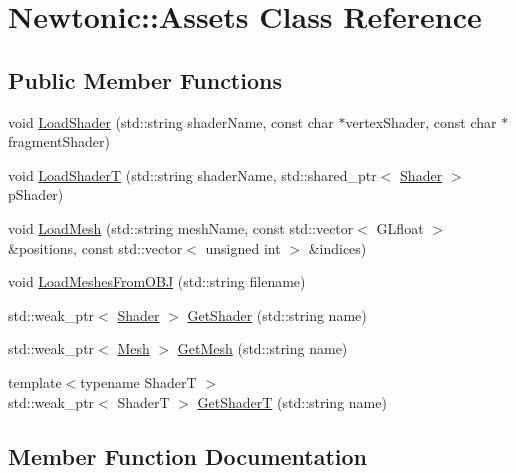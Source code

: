 \hypertarget{classNewtonic_1_1Assets}{}\section{Newtonic\+::Assets Class Reference}
\label{classNewtonic_1_1Assets}
\subsection*{Public Member Functions}
\begin{DoxyCompactItemize}
\item 
void \mbox{\hyperlink{classNewtonic_1_1Assets_ad7ec76d3228c2aa3139a952baadd3dd5}{Load\+Shader}} (std\+::string shader\+Name, const char $\ast$vertex\+Shader, const char $\ast$fragment\+Shader)
\item 
void \mbox{\hyperlink{classNewtonic_1_1Assets_a38d116145edba497b69ee539d8bea633}{Load\+ShaderT}} (std\+::string shader\+Name, std\+::shared\+\_\+ptr$<$ \mbox{\hyperlink{classNewtonic_1_1Shader}{Shader}} $>$ p\+Shader)
\item 
void \mbox{\hyperlink{classNewtonic_1_1Assets_ab188d1ad9d4dbb59abae15a32a8b1423}{Load\+Mesh}} (std\+::string mesh\+Name, const std\+::vector$<$ G\+Lfloat $>$ \&positions, const std\+::vector$<$ unsigned int $>$ \&indices)
\item 
void \mbox{\hyperlink{classNewtonic_1_1Assets_ae9b07e272b24fdaf8e2d1aa89a071694}{Load\+Meshes\+From\+O\+BJ}} (std\+::string filename)
\item 
std\+::weak\+\_\+ptr$<$ \mbox{\hyperlink{classNewtonic_1_1Shader}{Shader}} $>$ \mbox{\hyperlink{classNewtonic_1_1Assets_a475082f857a1da2ae5e58773f19701e0}{Get\+Shader}} (std\+::string name)
\item 
std\+::weak\+\_\+ptr$<$ \mbox{\hyperlink{classNewtonic_1_1Mesh}{Mesh}} $>$ \mbox{\hyperlink{classNewtonic_1_1Assets_a7640682470e122a336e75faa898d4f4b}{Get\+Mesh}} (std\+::string name)
\item 
{\footnotesize template$<$typename ShaderT $>$ }\\std\+::weak\+\_\+ptr$<$ ShaderT $>$ \mbox{\hyperlink{classNewtonic_1_1Assets_a5dddfcf54565dd99d9df4f7421d29769}{Get\+ShaderT}} (std\+::string name)
\end{DoxyCompactItemize}


\subsection{Member Function Documentation}
\mbox{\label{classNewtonic_1_1Assets_a7640682470e122a336e75faa898d4f4b}} 
